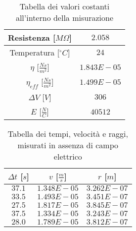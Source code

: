 \documentclass{article}
\begin{document}
\begin{multicols}{2}

\begin{table}[H]
	\centering
	\begin{tabular}{| c | c |}
		\hline
		Resistenza [$M\Omega$] & $2.058$\\
		\hline
		Temperatura [$^\circ C$] & $24$\\
		\hline
		$\eta$ [$\frac{Ns}{m^2}$] & $1.843E-05$\\
		\hline
		$\eta_{eff}$ [$\frac{Ns}{m^2}$] & $1.499E-05$\\
		\hline
		$\Delta V$ [$V$] & $306$\\
		\hline
		$E$ [$\frac N C$] & $40512$\\
		\hline
	\end{tabular}
	\caption{Tabella dei valori costanti all'interno della misurazione}
	\label{}
\end{table}

\columnbreak

\begin{table}[H]
	\centering
	\begin{tabular}{| c | c | c |}
		\hline
		$\Delta t$ [$s$] & $v$ [$\frac ms$] & $r$ [$m$] \\
		\hline
		$37.1$ & $1.348E-05$ & $3.262E-07$ \\
		$33.5$ & $1.493E-05$ & $3.451E-07$ \\
		$27.5$ & $1.817E-05$ & $3.845E-07$ \\
		$37.5$ & $1.334E-05$ & $3.243E-07$ \\
		$28.0$ & $1.789E-05$ & $3.812E-07$ \\
		\hline
	\end{tabular}
	\caption{Tabella dei tempi, velocità e raggi, misurati in assenza di campo elettrico}
	\label{}
\end{table}
	
\end{multicols}
\end{document}
